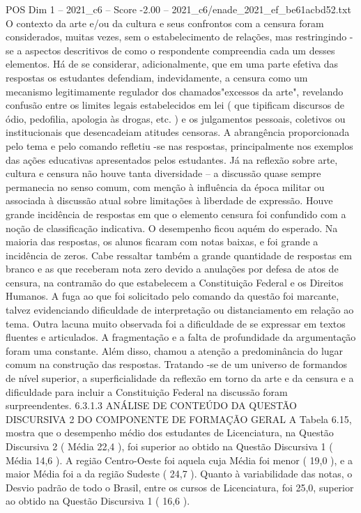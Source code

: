 \begin{textsample}{POS Dim 1 – 2021\_c6 – Score -2.00 – 2021\_c6/enade\_2021\_ef\_be61acbd52.txt}
O contexto da arte e/ou da cultura e seus confrontos com a censura foram considerados, muitas vezes, sem o estabelecimento de relações, mas restringindo -se a aspectos descritivos de como o respondente compreendia cada um desses elementos.
Há de se considerar, adicionalmente, que em uma parte efetiva das respostas os estudantes defendiam, indevidamente, a censura como um mecanismo legitimamente regulador dos chamados"excessos da arte", revelando confusão entre os limites legais estabelecidos em lei ( que tipificam discursos de ódio, pedofilia, apologia às drogas, etc. ) e os julgamentos pessoais, coletivos ou institucionais que desencadeiam atitudes censoras.
A abrangência proporcionada pelo tema e pelo comando refletiu -se nas respostas, principalmente nos exemplos das ações educativas apresentados pelos estudantes.
Já na reflexão sobre arte, cultura e censura não houve tanta diversidade – a discussão quase sempre permanecia no senso comum, com menção à influência da época militar ou associada à discussão atual sobre limitações à liberdade de expressão.
Houve grande incidência de respostas em que o elemento censura foi confundido com a noção de classificação indicativa.
O desempenho ficou aquém do esperado.
Na maioria das respostas, os alunos ficaram com notas baixas, e foi grande a incidência de zeros.
Cabe ressaltar também a grande quantidade de respostas em branco e as que receberam nota zero devido a anulações por defesa de atos de censura, na contramão do que estabelecem a Constituição Federal e os Direitos Humanos.
A fuga ao que foi solicitado pelo comando da questão foi marcante, talvez evidenciando dificuldade de interpretação ou distanciamento em relação ao tema.
Outra lacuna muito observada foi a dificuldade de se expressar em textos fluentes e articulados.
A fragmentação e a falta de profundidade da argumentação foram uma constante.
Além disso, chamou a atenção a predominância do lugar comum na construção das respostas.
Tratando -se de um universo de formandos de nível superior, a superficialidade da reflexão em torno da arte e da censura e a dificuldade para incluir a Constituição Federal na discussão foram surpreendentes. 6.3.1.3 ANÁLISE DE CONTEÚDO DA QUESTÃO DISCURSIVA 2 DO COMPONENTE DE FORMAÇÃO GERAL A Tabela 6.15, mostra que o desempenho médio dos estudantes de Licenciatura, na Questão Discursiva 2 ( Média 22,4 ), foi superior ao obtido na Questão Discursiva 1 ( Média 14,6 ).
A região Centro-Oeste foi aquela cuja Média foi menor ( 19,0 ), e a maior Média foi a da região Sudeste ( 24,7 ).
Quanto à variabilidade das notas, o Desvio padrão de todo o Brasil, entre os cursos de Licenciatura, foi 25,0, superior ao obtido na Questão Discursiva 1 ( 16,6 ).

\end{textsample}
